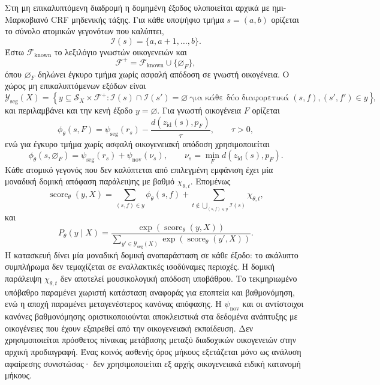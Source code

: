 \documentclass[11pt,a4paper]{article}
\begin{document}
Στη μη επικαλυπτόμενη διαδρομή η δομημένη έξοδος υλοποιείται αρχικά με ημι-Μαρκοβιανό CRF μηδενικής τάξης. Για κάθε υποψήφιο τμήμα $s=(a,b)$ ορίζεται το σύνολο ατομικών γεγονότων που καλύπτει,
\[
\mathcal I(s)=\{a,a+1,\ldots,b\}.
\]
Έστω $\mathcal F_{\mathrm{known}}$ το λεξιλόγιο γνωστών οικογενειών και
\[
\mathcal F^{+}=\mathcal F_{\mathrm{known}}\cup\{\varnothing_F\},
\]
όπου $\varnothing_F$ δηλώνει έγκυρο τμήμα χωρίς ασφαλή απόδοση σε γνωστή οικογένεια. Ο χώρος μη επικαλυπτόμενων εξόδων είναι
\[
\mathcal Y_{\mathrm{seg}}(X)=
\left\{
 y\subseteq\mathcal S_X\times\mathcal F^{+}:
 \mathcal I(s)\cap\mathcal I(s')=\varnothing
 \ \text{για κάθε δύο διαφορετικά }(s,f),(s',f')\in y
\right\},
\]
και περιλαμβάνει και την κενή έξοδο $y=\varnothing$. Για γνωστή οικογένεια $F$ ορίζεται
\[
\phi_{\theta}(s,F)=\psi_{\mathrm{seg}}(r_s)
-\frac{d\!\left(z_{\mathrm{id}}(s),p_F\right)}{\tau},
\qquad \tau>0,
\]
ενώ για έγκυρο τμήμα χωρίς ασφαλή οικογενειακή απόδοση χρησιμοποιείται
\[
\phi_{\theta}(s,\varnothing_F)=
\psi_{\mathrm{seg}}(r_s)+\psi_{\mathrm{nov}}\!\left(\nu_s\right),
\qquad
\nu_s=\min_F d\!\left(z_{\mathrm{id}}(s),p_F\right).
\]
Κάθε ατομικό γεγονός που δεν καλύπτεται από επιλεγμένη εμφάνιση έχει μία μοναδική δομική απόφαση παράλειψης με βαθμό $\chi_{\theta,t}$. Επομένως
\[
\operatorname{score}_{\theta}(y,X)
=
\sum_{(s,f)\in y}\phi_{\theta}(s,f)
+
\sum_{t\notin\bigcup_{(s,f)\in y}\mathcal I(s)}\chi_{\theta,t},
\]
και
\[
P_{\theta}(y\mid X)
=
\frac{\exp\!\left(\operatorname{score}_{\theta}(y,X)\right)}
{\displaystyle\sum_{y'\in\mathcal Y_{\mathrm{seg}}(X)}
 \exp\!\left(\operatorname{score}_{\theta}(y',X)\right)}.
\]
Η κατασκευή δίνει μία μοναδική δομική αναπαράσταση σε κάθε έξοδο: το ακάλυπτο συμπλήρωμα δεν τεμαχίζεται σε εναλλακτικές ισοδύναμες περιοχές. Η δομική παράλειψη $\chi_{\theta,t}$ δεν αποτελεί μουσικολογική απόδοση υποβάθρου. Το τεκμηριωμένο υπόβαθρο παραμένει χωριστή κατάσταση αναφοράς για εποπτεία και βαθμονόμηση, ενώ η αποχή παραμένει μεταγενέστερος κανόνας απόφασης. Η $\psi_{\mathrm{nov}}$ και οι αντίστοιχοι κανόνες βαθμονόμησης οριστικοποιούνται αποκλειστικά στα δεδομένα ανάπτυξης με οικογένειες που έχουν εξαιρεθεί από την οικογενειακή εκπαίδευση. Δεν χρησιμοποιείται πρόσθετος πίνακας μετάβασης μεταξύ διαδοχικών οικογενειών στην αρχική προδιαγραφή. Ένας κοινός ασθενής όρος μήκους εξετάζεται μόνο ως ανάλυση αφαίρεσης συνιστώσας· δεν χρησιμοποιείται εξ αρχής οικογενειακά ειδική κατανομή μήκους.
\end{document}
